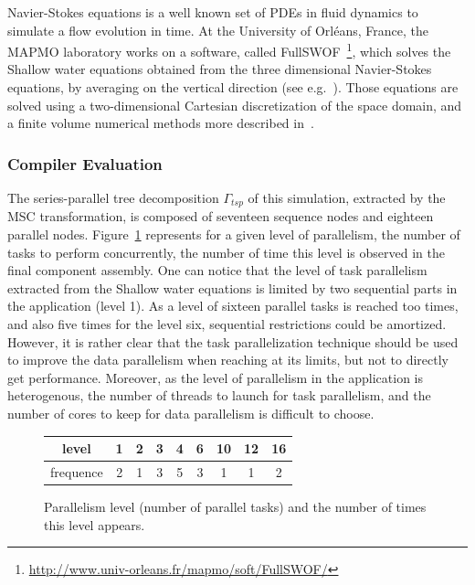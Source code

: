 Navier-Stokes equations is a well known set of PDEs in fluid dynamics to simulate a flow evolution in time. At the University of Orl\'eans, France, the MAPMO laboratory works on a software, called FullSWOF~\footnote{\url{http://www.univ-orleans.fr/mapmo/soft/FullSWOF/}}, which solves the Shallow water equations obtained from the three dimensional Navier-Stokes equations, by averaging on the vertical direction (see e.g.~\cite{Ferrari2004}). Those equations are solved using a two-dimensional Cartesian discretization of the space domain, and a finite volume numerical methods more described in~\cite{HeleneLS13}.

\subsubsection*{Compiler Evaluation}

The series-parallel tree decomposition $\Gamma_{tsp}$ of this simulation, extracted by the MSC transformation, is composed of seventeen sequence nodes and eighteen parallel nodes. Figure~\ref{fig:freq} represents for a given level of parallelism, \ie the number of tasks to perform concurrently, the number of time this level is observed in the final component assembly. One can notice that the level of task parallelism extracted from the Shallow water equations is limited by two sequential parts in the application (level 1). As a level of sixteen parallel tasks is reached too times, and also five times for the level six, sequential restrictions could be amortized. However, it is rather clear that the task parallelization technique should be used to improve the data parallelism when reaching at its limits, but not to directly get performance. Moreover, as the level of parallelism in the application is heterogenous, the number of threads to launch for task parallelism, and the number of cores to keep for data parallelism is difficult to choose.

\begin{figure}[!h]
 \begin{center}
 \begin{tabular}{c|c|c|c|c|c|c|c|c|}
   level & 1 & 2 & 3 & 4 & 6 & 10 & 12 & 16\\
   \hline
   frequence & 2 & 1 & 3 & 5 & 3 & 1 & 1 & 2\\
 \end{tabular}
\caption{Parallelism level (number of parallel tasks) and the number of times this level appears.}
\label{fig:freq}
 \end{center}
\end{figure}

